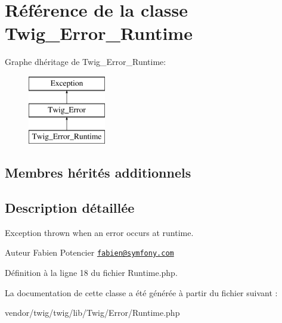 \hypertarget{class_twig___error___runtime}{}\section{Référence de la classe Twig\+\_\+\+Error\+\_\+\+Runtime}
\label{class_twig___error___runtime}
Graphe d\textquotesingle{}héritage de Twig\+\_\+\+Error\+\_\+\+Runtime\+:\begin{figure}[H]
\begin{center}
\leavevmode
\includegraphics[height=3.000000cm]{class_twig___error___runtime}
\end{center}
\end{figure}
\subsection*{Membres hérités additionnels}


\subsection{Description détaillée}
Exception thrown when an error occurs at runtime.

\begin{DoxyAuthor}{Auteur}
Fabien Potencier \href{mailto:fabien@symfony.com}{\tt fabien@symfony.\+com} 
\end{DoxyAuthor}


Définition à la ligne 18 du fichier Runtime.\+php.



La documentation de cette classe a été générée à partir du fichier suivant \+:\begin{DoxyCompactItemize}
\item 
vendor/twig/twig/lib/\+Twig/\+Error/Runtime.\+php\end{DoxyCompactItemize}
